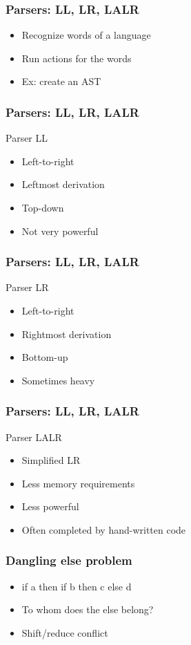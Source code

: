 
\begin{frame}
  \frametitle{Parsers: LL, LR, LALR}
    \begin{itemize}[<+->]
      \item Recognize words of a language
      \item Run actions for the words
      \item Ex: create an AST
    \end{itemize}
\end{frame}

\begin{frame}
  \frametitle{Parsers: LL, LR, LALR}
    Parser LL
    \begin{itemize}[<+->]
      \item Left-to-right
      \item Leftmost derivation
      \item Top-down
      \item Not very powerful
    \end{itemize}
\end{frame}

\begin{frame}
  \frametitle{Parsers: LL, LR, LALR}
    Parser LR
    \begin{itemize}[<+->]
      \item Left-to-right
      \item Rightmost derivation
      \item Bottom-up
      \item Sometimes heavy
    \end{itemize}
\end{frame}

\begin{frame}
  \frametitle{Parsers: LL, LR, LALR}
    Parser LALR
    \begin{itemize}[<+->]
      \item Simplified LR
      \item Less memory requirements
      \item Less powerful
      \item Often completed by hand-written code
    \end{itemize}
\end{frame}


\begin{frame}
  \frametitle{Dangling else problem}
    \begin{itemize}[<+->]
      \item if a then if b then c else d
      \item To whom does the else belong?
      \item Shift/reduce conflict
    \end{itemize}
\end{frame}

